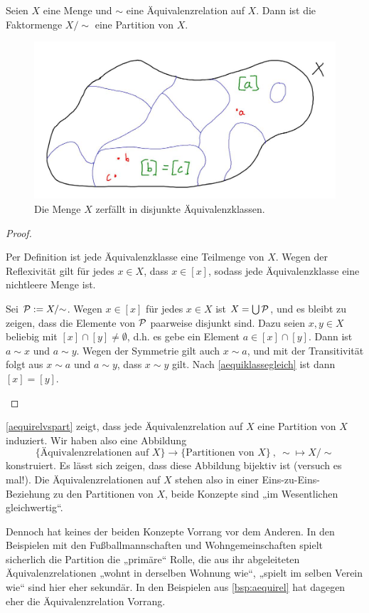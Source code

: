 \begin{satz} \label{aequirelvspart}
    Seien $X$ eine Menge und $\sim$ eine Äquivalenzrelation auf $X$. Dann ist die Faktormenge $X/{\sim}$ eine Partition von $X$.
    \begin{figure}[ht]
        \includegraphics[width=12cm]{./_img/equivalence.jpeg}
        \centering \caption{Die Menge $X$ zerfällt in disjunkte Äquivalenzklassen.}
    \end{figure}
\end{satz}
\begin{proof}
    \begin{labeling}[(P1)]
        \item Per Definition ist jede Äquivalenzklasse eine Teilmenge von $X$. Wegen der Reflexivität gilt für jedes $x\in X$, dass $x\in[x]$, sodass jede Äquivalenzklasse eine nichtleere Menge ist.
        \item Sei $\mathcal P:=X/{\sim}$. Wegen $x\in [x]$ für jedes $x\in X$ ist $X=\bigcup \mathcal P$, und es bleibt zu zeigen, dass die Elemente von $\mathcal P$ paarweise disjunkt sind. Dazu seien $x,y\in X$ beliebig mit $[x]\cap [y]\neq \emptyset$, d.h. es gebe ein Element $a\in [x]\cap [y]$. Dann ist $a\sim x$ und $a\sim y$. Wegen der Symmetrie gilt auch $x\sim a$, und mit der Transitivität folgt aus $x\sim a$ und $a\sim y$, dass $x\sim y$ gilt. Nach \cref{aequiklassegleich} ist dann $[x]=[y]$. \qedhere
    \end{labeling}
\end{proof}


\begin{bem}
    \cref{aequirelvspart} zeigt, dass jede Äquivalenzrelation auf $X$ eine Partition von $X$ induziert. Wir haben also eine Abbildung
        \[ \{ \text{Äquivalenzrelationen auf $X$}\} \to \{ \text{Partitionen von $X$}\} \ ,\ {\sim} \mapsto X/{\sim} \]
    konstruiert. Es lässt sich zeigen, dass diese Abbildung bijektiv ist (versuch es mal!). Die Äquivalenzrelationen auf $X$ stehen also in einer Eins-zu-Eins-Beziehung zu den Partitionen von $X$, beide Konzepte sind „im Wesentlichen gleichwertig“.
    
    Dennoch hat keines der beiden Konzepte Vorrang vor dem Anderen. In den Beispielen mit den Fußballmannschaften und Wohngemeinschaften spielt sicherlich die Partition die „primäre“ Rolle, die aus ihr abgeleiteten Äquivalenzrelationen „wohnt in derselben Wohnung wie“, „spielt im selben Verein wie“ sind hier eher sekundär. In den Beispielen aus \cref{bsp:aequirel} hat dagegen eher die Äquivalenzrelation Vorrang.
\end{bem}





